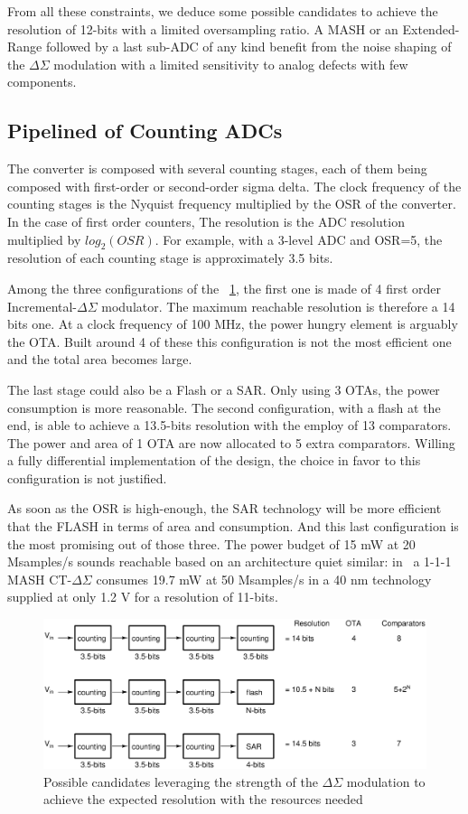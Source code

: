 From all these constraints, we deduce some possible candidates to achieve the resolution of 12-bits with a limited oversampling ratio.
A MASH or an Extended-Range followed by a last sub-ADC of any kind benefit from the noise shaping of the $\Delta\Sigma$ modulation with a limited sensitivity to analog defects with few components.

\subsection{Pipelined of Counting ADCs}
The converter is composed with several counting stages, each of them being composed with first-order or second-order sigma delta. The clock frequency of the
counting stages is the Nyquist frequency multiplied by the OSR of the converter. In the case of first order counters, The resolution is the ADC resolution multiplied by \(log_2(OSR)\). For example, with a 3-level ADC and OSR=5, the resolution of each counting stage is approximately 3.5 bits.

Among the three configurations of the \figurename~\ref{fig:counting-candidates}, the first one is made of 4 first order Incremental-\(\Delta \Sigma\) modulator. The maximum reachable resolution is therefore a 14 bits one. At a clock frequency of 100 MHz, the power hungry element is arguably the OTA\@. Built around 4 of these this configuration is not the most efficient one and the total area becomes large.

The last stage could also be a Flash or a SAR\@. Only using 3 OTAs, the power consumption is more reasonable. The second configuration, with a flash at the end, is able to achieve a 13.5-bits resolution with the employ of 13 comparators. The power and area of 1 OTA are now allocated to 5 extra comparators. Willing a fully differential implementation of the design, the choice in favor to this configuration is not justified.

As soon as the OSR is high-enough, the SAR technology will be more efficient that the FLASH in terms of area and consumption. And this last configuration is the most promising out of those three. The power budget of 15 mW at 20 Msamples/s sounds reachable based on an architecture quiet similar: in~\cite{Liu2017} a 1-1-1 MASH CT-\(\Delta\Sigma\) consumes 19.7 mW at 50 Msamples/s in a 40 nm technology supplied at only 1.2 V for a resolution of 11-bits.

\begin{figure}[htp]
	\centering
	\includegraphics[width=.9\textwidth]{Chapter4/Figs/study/counting-conversion.ps}
	\caption{Possible candidates leveraging the strength of the \(\Delta \Sigma\) modulation to achieve the expected resolution with the resources needed}
	\label{fig:counting-candidates}
\end{figure}

